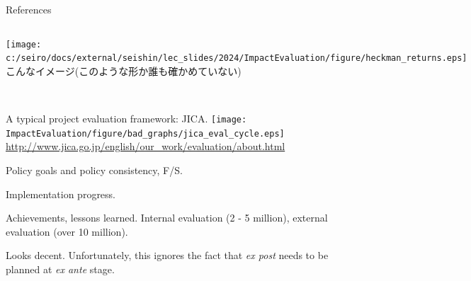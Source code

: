 \begin{frame}[allowframebreaks]{References}
\scriptsize
\setlength{\baselineskip}{8pt}


\end{frame}

\begin{frame}[label=HeckmanCurve]{}
\begin{columns}[T]
\column{.5\paperwidth}
\hfil\texttt{[image: c:/seiro/docs/external/seishin/lec\_slides/2024/ImpactEvaluation/figure/heckman\_returns.eps]}
\column{.45\paperwidth}
こんなイメージ(このような形か誰も確かめていない)\\~\\
\hfill\hyperlink{SmallSampleBias<5>}{}
\end{columns}
\end{frame}


\begin{frame}{}
A typical project evaluation framework: JICA.
\hfil\texttt{[image: ImpactEvaluation/figure/bad\_graphs/jica\_eval\_cycle.eps]}\\
\hfill{\scriptsize\url{http://www.jica.go.jp/english/our_work/evaluation/about.html}}
\begin{description}
\vspace{1.0ex}\setlength{\itemsep}{1.0ex}\setlength{\baselineskip}{12pt}
\item[Ex-ante] Policy goals and policy consistency, F/S.
\item[Interim] Implementation progress.
\item[Ex-post] Achievements, lessons learned. Internal evaluation (2 - 5 million), external evaluation (over 10 million).
\end{description}
Looks decent. Unfortunately, this ignores the fact that \textit{ex post} needs to be planned at \textit{ex ante} stage.
\end{frame}

